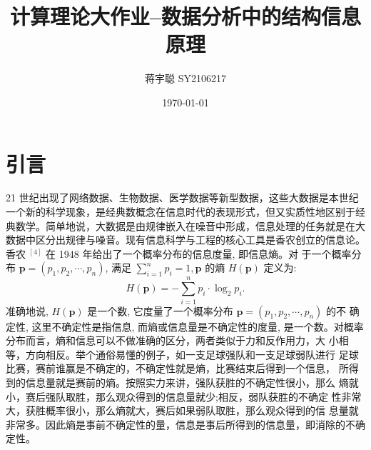 \documentclass[a4paper]{apa6}
\author{蒋宇聪 SY2106217}
\affiliation{北京航空航天大学}
\date{\today}
\title{计算理论大作业--数据分析中的结构信息原理}
\begin{document}
\maketitle

\section{引言}
\label{sec:orgd2ebe99}
21 世纪出现了网络数据、生物数据、医学数据等新型数据，这些大数据是本世纪一个新的科学现象，是经典数概念在信息时代的表现形式，但又实质性地区别于经典数学。简单地说，大数据是由规律嵌入在噪音中形成，信息处理的任务就是在大数据中区分出规律与噪音。现有信息科学与工程的核心工具是香农创立的信息论。香农 \({ }^{[4]}\) 在 1948 年给出了一个概率分布的信息度量, 即信息熵。对 于一个概率分布 \(\boldsymbol{p}=\left(p_{1}, p_{2}, \cdots, p_{n}\right)\), 满足 \(\sum_{i=1}^{n} p_{i}=1, \boldsymbol{p}\) 的熵 \(H(\boldsymbol{p})\) 定义为:
$$
H(\boldsymbol{p})=-\sum_{i=1}^{n} p_{i} \cdot \log _{2} p_{i} .
$$
准确地说, \(H(\boldsymbol{p})\) 是一个数, 它度量了一个概率分布 \(\boldsymbol{p}=\left(p_{1}, p_{2}, \cdots, p_{n}\right)\) 的不 确定性, 这里不确定性是指信息, 而熵或信息量是不确定性的度量, 是一个数。对概率分布而言，熵和信息可以不做准确的区分，两者类似于力和反作用力，大 小相等，方向相反。举个通俗易懂的例子，如一支足球强队和一支足球弱队进行 足球比赛，赛前谁赢是不确定的，不确定性就是熵，比赛结束后得到一个信息， 所得到的信息量就是赛前的熵。按照实力来讲，强队获胜的不确定性很小，那么 熵就小，赛后强队取胜，那么观众得到的信息量就少;相反，弱队获胜的不确定 性非常大，获胜概率很小，那么熵就大，赛后如果弱队取胜，那么观众得到的信 息量就非常多。因此熵是事前不确定性的量，信息是事后所得到的信息量，即消除的不确定性。
\end{document}
